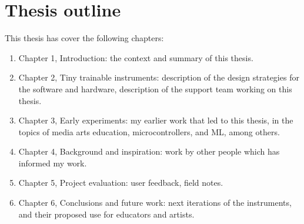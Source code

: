 \section{Thesis outline}

This thesis has cover the following chapters:

\begin{enumerate}
  \item Chapter 1, Introduction: the context and summary of this thesis.
  \item Chapter 2, Tiny trainable instruments: description of the design strategies for the software and hardware, description of the support team working on this thesis.
  \item Chapter 3, Early experiments: my earlier work that led to this thesis, in the topics of media arts education, microcontrollers, and \acrshort{ML}, among others.
  \item Chapter 4, Background and inspiration: work by other people which has informed my work.
  \item Chapter 5, Project evaluation: user feedback, field notes.
  \item Chapter 6, Conclusions and future work: next iterations of the instruments, and their proposed use for educators and artists.
  \end{enumerate}
